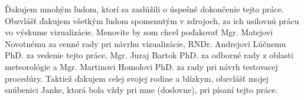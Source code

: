 \thispagestyle{empty}
\vspace*{\fill}
\hfill
\begin{minipage}{0.65\textwidth}
\vspace{0pt}\raggedright

Ďakujem mnohým ľudom, ktorí sa zaslúžili o úspešné dokončenie tejto práce. Obzvlášť ďakujem všetkým ľudom spomenutým v zdrojoch, za ich usilovnú prácu vo výskume vizualizácie. Menovite by som chcel poďakovať Mgr. Matejovi Novotnému za cenné rady pri návrhu vizualizácie, RNDr. Andrejovi Lúčnemu PhD. za vedenie tejto práce, Mgr. Juraj Bartok PhD. za odborné rady z oblasti meteorológie a Mgr. Martinovi Homolovi PhD. za rady pri návrh testovacej procedúry. Taktiež ďakujem celej svojej rodine a blízkym, obzvlášť mojej snúbenici Janke, ktorá bola vždy pri mne (doslovne), pri písaní tejto práce.

\end{minipage}
\vspace*{\fill}
\eject